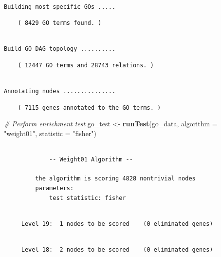 \documentclass[]{article}
\newenvironment{Shaded}{\begin{snugshade}}{\end{snugshade}}
\newcommand{\KeywordTok}[1]{\textcolor[rgb]{0.13,0.29,0.53}{\textbf{#1}}}
\newcommand{\DataTypeTok}[1]{\textcolor[rgb]{0.13,0.29,0.53}{#1}}
\newcommand{\StringTok}[1]{\textcolor[rgb]{0.31,0.60,0.02}{#1}}
\newcommand{\CommentTok}[1]{\textcolor[rgb]{0.56,0.35,0.01}{\textit{#1}}}
\newcommand{\NormalTok}[1]{#1}
\begin{document}
\begin{verbatim}

Building most specific GOs .....
\end{verbatim}

\begin{verbatim}
    ( 8429 GO terms found. )
\end{verbatim}

\begin{verbatim}

Build GO DAG topology ..........
\end{verbatim}

\begin{verbatim}
    ( 12447 GO terms and 28743 relations. )
\end{verbatim}

\begin{verbatim}

Annotating nodes ...............
\end{verbatim}

\begin{verbatim}
    ( 7115 genes annotated to the GO terms. )
\end{verbatim}

\begin{Shaded}
\begin{Highlighting}[]
\CommentTok{# Perform enrichment test}
\NormalTok{go_test <-}\StringTok{ }\KeywordTok{runTest}\NormalTok{(go_data, }\DataTypeTok{algorithm =} \StringTok{"weight01"}\NormalTok{, }\DataTypeTok{statistic =} \StringTok{"fisher"}\NormalTok{)}
\end{Highlighting}
\end{Shaded}

\begin{verbatim}

             -- Weight01 Algorithm -- 

         the algorithm is scoring 4828 nontrivial nodes
         parameters: 
             test statistic: fisher
\end{verbatim}

\begin{verbatim}

     Level 19:  1 nodes to be scored    (0 eliminated genes)
\end{verbatim}

\begin{verbatim}

     Level 18:  2 nodes to be scored    (0 eliminated genes)
\end{verbatim}
\end{document}
